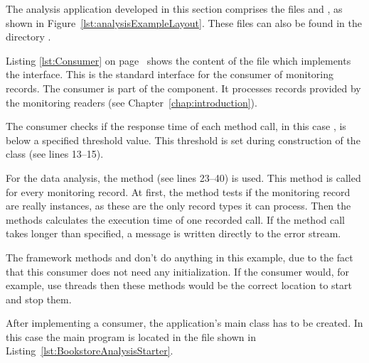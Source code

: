 \noindent The analysis application developed in this section comprises the files %
 and , as shown in Figure~\ref{lst:analysisExampleLayout}. %
These files can also be found in the directory \dir{\manualInstrumentedBookstoreApplicationDirDistro{}/}. 

Listing \ref{lst:Consumer} on page~\pageref{lst:Consumer} shows the content of the  file which implements the  interface. This is the standard interface for the consumer of \Kieker{} monitoring records. The consumer is part of the \KiekerAnalysisPart{} component. It processes records provided by the monitoring readers (see Chapter~\ref{chap:introduction}). %

\setJavaCodeListing       



\noindent The consumer checks if the response time of each method call, in this case , is below %
a specified threshold value. %
This threshold is set during construction of the  class (see lines 13--15). 

For the data analysis, the method  (see lines 23--40) is used. %
This method is called for every monitoring record. At first, the method tests if %
the monitoring record are really  instances, as %
these are the only record types it can process. Then the methods calculates the %
execution time of one recorded  call. If the method call takes %
longer than specified, a message is written directly to the error stream.

The framework methods  and  don't do anything %
in this example, due to the fact that this consumer does not need any initialization. %
If the consumer would, for example, use threads then these methods would be the %
correct location to start and stop them.

After implementing a consumer, the application's main class has to be created. %
In this case the main program is located in the  %
file shown in Listing~\ref{lst:BookstoreAnalysisStarter}.

